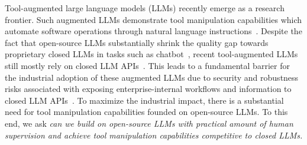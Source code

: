 
Tool-augmented large language models (LLMs) recently emerge as a research frontier. Such augmented LLMs demonstrate tool manipulation capabilities which automate software operations through natural language instructions~\cite{schick2023toolformer,li2023api,qin2023tool,autogpt,shen2023hugginggpt}. 
Despite the fact that open-source LLMs substantially shrink the quality gap towards proprietary closed LLMs in tasks such as chatbot~\cite{vicuna2023,openchatkit,laionOA,dolly2dot0}, recent tool-augmented LLMs still mostly rely on closed LLM APIs~\cite{schick2023toolformer,li2023api,qin2023tool,autogpt}. 
This leads to a fundamental barrier for the industrial adoption of these augmented LLMs due to security and robustness risks associated with exposing enterprise-internal workflows and information to closed LLM APIs~\cite{samsung,jpmorgan}.
To maximize the industrial impact, there is a substantial need for tool manipulation capabilities founded on open-source LLMs. 
To this end, we ask \emph{can we build on open-source LLMs with practical amount of human supervision and achieve tool manipulation capabilities competitive to closed LLMs.}


